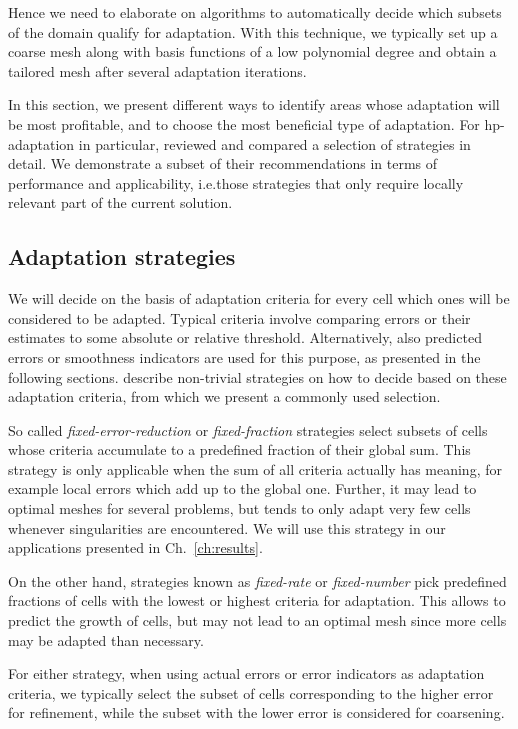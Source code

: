 Hence we need to elaborate on algorithms to automatically decide which subsets of the domain qualify for adaptation. With this technique, we typically set up a coarse mesh along with basis functions of a low polynomial degree and obtain a tailored mesh after several adaptation iterations.

In this section, we present different ways to identify areas whose adaptation will be most profitable, and to choose the most beneficial type of adaptation. For hp-adaptation in particular, \textcite{mitchell2014} reviewed and compared a selection of strategies in detail. We demonstrate a subset of their recommendations in terms of performance and applicability, i.e.\@ those strategies that only require locally relevant part of the current solution.



\subsection{Adaptation strategies}
\label{ssec:strategy}

We will decide on the basis of adaptation criteria for every cell which ones will be considered to be adapted. Typical criteria involve comparing errors or their estimates to some absolute or relative threshold. Alternatively, also predicted errors or smoothness indicators are used for this purpose, as presented in the following sections. \textcite[Sec.~5.2]{bangerth2003} describe non-trivial strategies on how to decide based on these adaptation criteria, from which we present a commonly used selection.

So called \textit{fixed-error-reduction} or \textit{fixed-fraction} strategies select subsets of cells whose criteria accumulate to a predefined fraction of their global sum. This strategy is only applicable when the sum of all criteria actually has meaning, for example local errors which add up to the global one. Further, it may lead to optimal meshes for several problems, but tends to only adapt very few cells whenever singularities are encountered. We will use this strategy in our applications presented in Ch.~\ref{ch:results}.

On the other hand, strategies known as \textit{fixed-rate} or \textit{fixed-number} pick predefined fractions of cells with the lowest or highest criteria for adaptation. This allows to predict the growth of cells, but may not lead to an optimal mesh since more cells may be adapted than necessary.

For either strategy, when using actual errors or error indicators as adaptation criteria, we typically select the subset of cells corresponding to the higher error for refinement, while the subset with the lower error is considered for coarsening.

